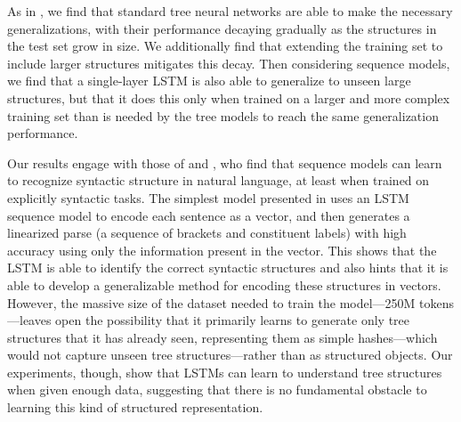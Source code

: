 As in , we find that standard tree neural networks are able to make the necessary generalizations, with their performance decaying gradually as the structures in the test set grow in size. We additionally find that extending the training set to include larger structures mitigates this decay. Then considering sequence models, we find that a single-layer LSTM is also able to generalize to unseen large structures, but that it does this only when trained on a larger and more complex training set than is needed by the tree models to reach the same generalization performance.

Our results engage with those of \cite{vinyals2014grammar} and \cite{dyer2015transition}, who find that sequence models can learn to recognize syntactic structure in natural language, at least when trained on explicitly syntactic tasks. The simplest model presented in \cite{vinyals2014grammar} uses an LSTM sequence model to encode each sentence as a vector, and then generates a linearized parse (a sequence of brackets and constituent labels) with high accuracy using only the information present in the vector. This shows that the LSTM is able to identify the correct syntactic structures and also hints that it is able to develop a generalizable method for encoding these structures in vectors. However, the massive size of the dataset needed to train the model---250M tokens---leaves open the possibility that it primarily learns to generate only tree structures that it has already seen, representing them as simple hashes---which would not capture unseen tree structures---rather than as structured objects.
Our experiments, though, show that LSTMs can learn to understand tree structures when given enough data, suggesting that there is no fundamental obstacle to learning this kind of structured representation.